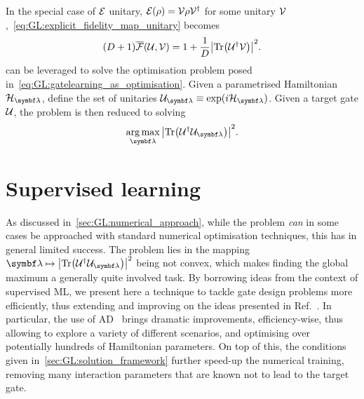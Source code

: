 In the special case of ${\mathcal{E}}$ unitary, ${\mathcal{E}}(\rho)={\mathcal{V}}\rho {\mathcal{V}}^\dagger$ for some unitary ${\mathcal{V}}$,~\cref{eq:GL:explicit_fidelity_map_unitary} becomes
\begin{equation}
    (D+1) \overline{{\mathcal{F}}}({\mathcal{U}}, {\mathcal{V}}) =
    1 + \frac{1}{D} \abs{\Tr({\mathcal{U}}^\dagger {\mathcal{V}})}^2.
    \label{eq:GL:explicit_fidelity_unitary_unitary}
\end{equation}
 can be leveraged to solve the optimisation problem posed in~\cref{eq:GL:gatelearning_as_optimisation}.
Given a parametrised Hamiltonian $\calH_{\bslambda}$, define the set of unitaries $\calU_{\bslambda}\equiv\exponential(i\calH_{\bslambda})$. Given a target gate ${\mathcal{U}}$, the problem is then reduced to solving
\begin{equation}
    \argmax_{\bslambda} \abs{\Tr(\calU^\dagger \calU_{\bslambda})}^2.
\end{equation}



\section{Supervised learning}
\label{sec:GL:supervised_learning}

As discussed in~\cref{sec:GL:numerical_approach}, while the problem \emph{can} in some cases be approached with standard numerical optimisation techniques, this has in general limited success.
The problem lies in the mapping $\bslambda\mapsto\abs{\Tr(\calU^\dagger \calU_{\bslambda})}^2$ being not convex, which makes finding the global maximum a generally quite involved task.
By borrowing ideas from the context of supervised \ac{ML}, we present here a technique to tackle gate design problems more efficiently, thus extending and improving on the ideas presented in Ref.~\cite{banchi2016quantum}.
In particular, the use of \ac{AD}~\cite{baydin2018automatic,bartholomewbiggs2000automatic,wengert1964a,bischof2008advances} brings dramatic improvements, efficiency-wise, thus allowing to explore a variety of different scenarios, and optimising over potentially hundreds of Hamiltonian parameters.
On top of this, the conditions given in~\cref{sec:GL:solution_framework} further speed-up the numerical training, removing many interaction parameters that are known not to lead to the target gate.

